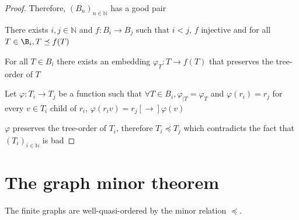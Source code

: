 \begin{proof}
  Therefore, \(\left(B_n\right)_{n\in\mathbb{N}}\) has a good pair

  There exists \(i,j\in\mathbb{N}\) and \(f:B_i\to B_j\) such that \(i<j\), \(f\) injective and for all \(T\in\B_i, T\preceq f(T)\)

  For all \(T\in B_i\) there exists an embedding \(\varphi_T:T\to f(T)\) that preserves the tree-order of \(T\)

  Let \(\varphi:T_i\to T_j\) be a function such that \(\forall T\in B_i, \varphi_{|T}=\varphi_T\) and \(\varphi(r_i)=r_j\) for every \(v\in T_i\) child of \(r_i\), \(\varphi(r_iv)=r_j[\to]\varphi(v)\)

  \(\varphi\) preserves the tree-order of \(T_i\), therefore \(T_i\preceq T_j\) which contradicts the fact that \(\left(T_i\right)_{i\in\mathbb{N}}\) is bad
\end{proof}

\setcounter{section}{6}
\section{The graph minor theorem}

\begin{theorem}
  \label{theo:GraphMinorTheorem}   \leanok
  The finite graphs are well-quasi-ordered by the minor relation $\preceq$.
\end{theorem}

